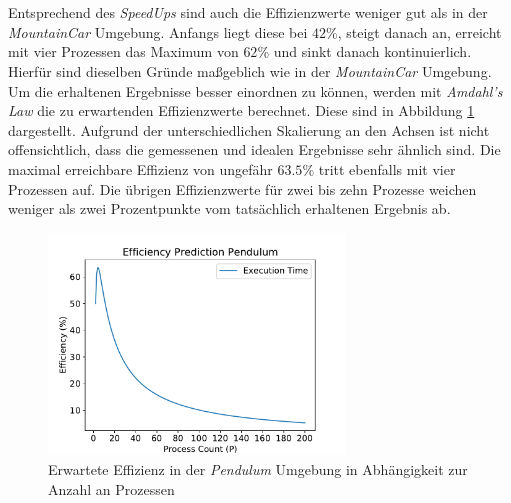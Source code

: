 \\\\
Entsprechend des \emph{SpeedUps} sind auch die Effizienzwerte weniger gut als in der \emph{MountainCar} Umgebung. Anfangs liegt diese bei $42\%$, steigt danach an, erreicht mit vier Prozessen das Maximum von $62\%$ und sinkt danach kontinuierlich. Hierfür sind dieselben Gründe maßgeblich wie in der \emph{MountainCar} Umgebung. Um die erhaltenen Ergebnisse besser einordnen zu können, werden mit \emph{Amdahl's Law} die zu erwartenden Effizienzwerte berechnet. Diese sind in Abbildung \ref{fig:pendulumr_efficiency_predidction} dargestellt. Aufgrund der unterschiedlichen Skalierung an den Achsen ist nicht offensichtlich, dass die gemessenen und idealen Ergebnisse sehr ähnlich sind. Die maximal erreichbare Effizienz von ungefähr $63.5\%$ tritt ebenfalls mit vier Prozessen auf. Die übrigen Effizienzwerte für zwei bis zehn Prozesse weichen weniger als zwei Prozentpunkte vom tatsächlich erhaltenen Ergebnis ab. 
\begin{figure}[!h]
	\centering
	\includegraphics[width=0.7\textwidth]{./img/pendulum_analysis/pendulum_efficiency_prediction.pdf} 
	\caption{Erwartete Effizienz in der \emph{Pendulum} Umgebung in Abhängigkeit zur Anzahl an Prozessen}
	\label{fig:pendulumr_efficiency_predidction}
\end{figure}

